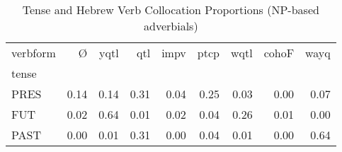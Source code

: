 \begin{table}[htbp!]
\centering
\caption{Tense and Hebrew Verb Collocation Proportions (NP-based adverbials)}
\label{table:np_tense_pr}
\begin{tabular}{lrrrrrrrr}
\toprule
verbform &     Ø &  yqtl &   qtl &  impv &  ptcp &  wqtl &  cohoF &  wayq \\
tense &       &       &       &       &       &       &        &       \\
\midrule
PRES  &  0.14 &  0.14 &  0.31 &  0.04 &  0.25 &  0.03 &   0.00 &  0.07 \\
FUT   &  0.02 &  0.64 &  0.01 &  0.02 &  0.04 &  0.26 &   0.01 &  0.00 \\
PAST  &  0.00 &  0.01 &  0.31 &  0.00 &  0.04 &  0.01 &   0.00 &  0.64 \\
\bottomrule
\end{tabular}
\end{table}
